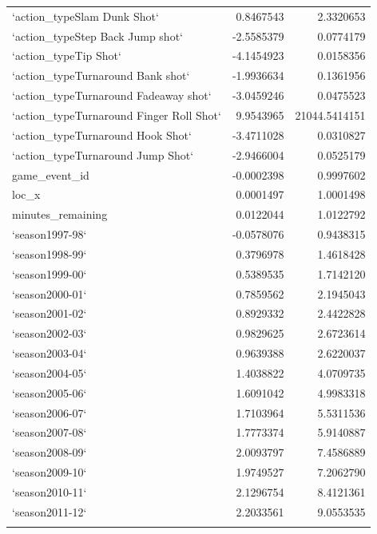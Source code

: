 \documentclass[american,]{article}
\begin{document}
\begin{longtable}{lrr}
\rowcolor{gray!6}  `action\_typeSlam Dunk Shot` & 0.8467543 & 2.3320653\\
\addlinespace
`action\_typeStep Back Jump shot` & -2.5585379 & 0.0774179\\
\rowcolor{gray!6}  `action\_typeTip Shot` & -4.1454923 & 0.0158356\\
`action\_typeTurnaround Bank shot` & -1.9936634 & 0.1361956\\
\rowcolor{gray!6}  `action\_typeTurnaround Fadeaway shot` & -3.0459246 & 0.0475523\\
`action\_typeTurnaround Finger Roll Shot` & 9.9543965 & 21044.5414151\\
\addlinespace
\rowcolor{gray!6}  `action\_typeTurnaround Hook Shot` & -3.4711028 & 0.0310827\\
`action\_typeTurnaround Jump Shot` & -2.9466004 & 0.0525179\\
\rowcolor{gray!6}  game\_event\_id & -0.0002398 & 0.9997602\\
loc\_x & 0.0001497 & 1.0001498\\
\rowcolor{gray!6}  minutes\_remaining & 0.0122044 & 1.0122792\\
\addlinespace
`season1997-98` & -0.0578076 & 0.9438315\\
\rowcolor{gray!6}  `season1998-99` & 0.3796978 & 1.4618428\\
`season1999-00` & 0.5389535 & 1.7142120\\
\rowcolor{gray!6}  `season2000-01` & 0.7859562 & 2.1945043\\
`season2001-02` & 0.8929332 & 2.4422828\\
\addlinespace
\rowcolor{gray!6}  `season2002-03` & 0.9829625 & 2.6723614\\
`season2003-04` & 0.9639388 & 2.6220037\\
\rowcolor{gray!6}  `season2004-05` & 1.4038822 & 4.0709735\\
`season2005-06` & 1.6091042 & 4.9983318\\
\rowcolor{gray!6}  `season2006-07` & 1.7103964 & 5.5311536\\
\addlinespace
`season2007-08` & 1.7773374 & 5.9140887\\
\rowcolor{gray!6}  `season2008-09` & 2.0093797 & 7.4586889\\
`season2009-10` & 1.9749527 & 7.2062790\\
\rowcolor{gray!6}  `season2010-11` & 2.1296754 & 8.4121361\\
`season2011-12` & 2.2033561 & 9.0553535\\
\addlinespace

\end{longtable}
\end{document}
